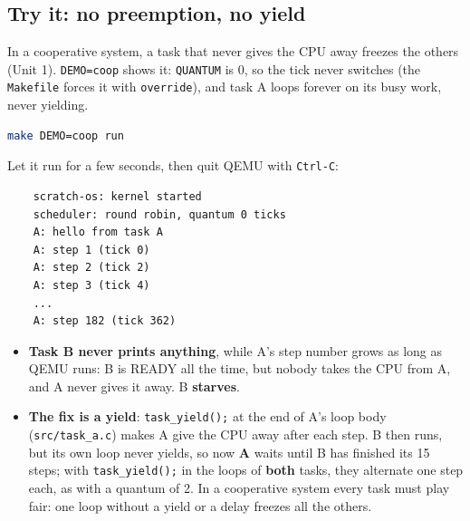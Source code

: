 \subsection{Try it: no preemption, no yield}
In a cooperative system, a task that never gives the CPU away freezes the others (Unit 1). \texttt{DEMO=coop} shows it: \texttt{QUANTUM} is 0, so the tick never switches (the \texttt{Makefile} forces it with \texttt{override}), and task A loops forever on its busy work, never yielding.
\begin{lstlisting}[language=bash]
    make DEMO=coop run
\end{lstlisting}
Let it run for a few seconds, then quit QEMU with \texttt{Ctrl-C}:
\begin{verbatim}
    scratch-os: kernel started
    scheduler: round robin, quantum 0 ticks
    A: hello from task A
    A: step 1 (tick 0)
    A: step 2 (tick 2)
    A: step 3 (tick 4)
    ...
    A: step 182 (tick 362)
\end{verbatim}
\begin{itemize}
    \item \textbf{Task B never prints anything}, while A's step number grows as long as QEMU runs: B is READY all the time, but nobody takes the CPU from A, and A never gives it away. B \textbf{starves}.
    \item \textbf{The fix is a yield}: \texttt{task\_yield();} at the end of A's loop body (\texttt{src/task\_a.c}) makes A give the CPU away after each step. B then runs, but its own loop never yields, so now \textbf{A} waits until B has finished its 15 steps; with \texttt{task\_yield();} in the loops of \textbf{both} tasks, they alternate one step each, as with a quantum of 2. In a cooperative system every task must play fair: one loop without a yield or a delay freezes all the others.
\end{itemize}

